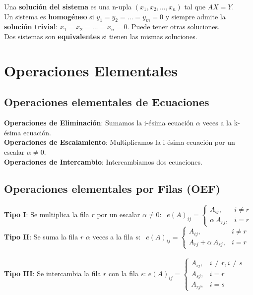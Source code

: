 \documentclass[11pt,a4paper]{article}
\begin{document}
Una \textbf{soluci\'on del sistema} es una n-upla $(x_1, x_2, ..., x_n)$ tal que $AX = Y$.\\
Un sistema es \textbf{homog\'eneo} si $y_1 = y_2 = \hdots = y_m = 0$ y siempre admite la \textbf{soluci\'on trivial}: $x_1 = x_2 = \hdots = x_n = 0$. Puede tener otras soluciones.\\
Dos sistemas son \textbf{equivalentes} si tienen las mismas soluciones.


\section{Operaciones Elementales}

\subsection{Operaciones elementales de Ecuaciones}
\textbf{Operaciones de Eliminaci\'on}: Sumamos la i-\'esima ecuaci\'on $\alpha$ veces a la k-\'esima ecuaci\'on.\\
\textbf{Operaciones de Escalamiento}: Multiplicamos la i-\'esima ecuaci\'on por un escalar $\alpha \not = 0$.\\
\textbf{Operaciones de Intercambio}: Intercambiamos dos ecuaciones.

\subsection{Operaciones elementales por Filas (OEF)}
\textbf{Tipo I}: Se multiplica la fila $r$ por un escalar $\alpha \not = 0$: 
$\ \ e(A)_{ij} = \left\{ \begin{array}{ll} A_{ij}, & i \not = r \\ \alpha\ A_{rj}, & i = r \end{array}\right.$\\
\textbf{Tipo II}: Se suma la fila $r$ $\alpha$ veces a la fila $s$:
$\ \ e(A)_{ij} = \left\{ \begin{array}{ll} A_{ij}, & i \not = r \\ A_{rj} + \alpha\ A_{sj}, & i = r \end{array}\right.$\\
\\
\textbf{Tipo III}: Se intercambia la fila $r$ con la fila $s$: 
$e(A)_{ij} = \left\{ \begin{array}{ll} 
A_{ij}, & i \not = r, i \not = s \\ 
A_{sj}, & i = r\\
A_{rj}, & i = s
\end{array}\right.$\\
\end{document}
